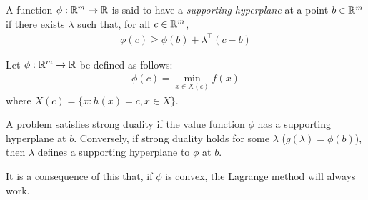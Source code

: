 \documentclass{../../template/note}
\begin{document}
    \begin{definition}
        A function $\phi: \mathbb R^m \to \mathbb R$ is said to have a \emph{supporting hyperplane} at a point $b \in \mathbb R^m$ if there exists $\lambda$ such that, for all $c \in \mathbb R^m$,
        \begin{align*}
            \phi(c) \geq \phi(b) + \lambda^\intercal (c-b)
        \end{align*}
    \end{definition}

    \begin{definition}
        Let $\phi: \mathbb R^m \to \mathbb R$ be defined as follows:
        \begin{align*}
            \phi(c) = \min_{x \in X(c)} f(x)
        \end{align*}
        where $X(c) = \{x: h(x) = c, x \in X\}$.        
    \end{definition}
    
    \begin{theorem}
        A problem satisfies strong duality if the value function $\phi$ has a supporting hyperplane at $b$. Conversely, if strong duality holds for some $\lambda$ ($g(\lambda) = \phi(b)$), then $\lambda$ defines a supporting hyperplane to $\phi$ at $b$.
    \end{theorem}
    
    \begin{remark*}
        It is a consequence of this that, if $\phi$ is convex, the Lagrange method will always work.
    \end{remark*}
\end{document}
